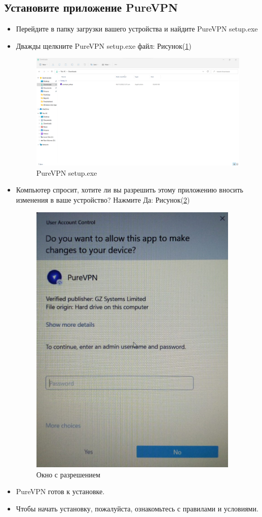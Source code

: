 \subsection{Установите приложение PureVPN} 
\begin{itemize}
\item Перейдите в папку загрузки вашего устройства и найдите PureVPN setup.exe
\item Дважды щелкните PureVPN setup.exe файл:  Рисунок(\ref{fig:2})
\begin{figure}[H]
\includegraphics[width=14cm]{2.png}
\centering
\caption{PureVPN setup.exe}
\label{fig:2}
\end{figure}
\item Компьютер спросит, хотите ли вы разрешить этому приложению вносить изменения в ваше устройство? Нажмите Да:  Рисунок(\ref{fig:3})
\begin{figure}[H]
\includegraphics[width=10cm]{3.png}
\centering
\caption{Окно с разрешением}
\label{fig:3}
\end{figure}
\item PureVPN готов к установке.
\item Чтобы начать установку, пожалуйста, ознакомьтесь с правилами и условиями.


\end{itemize}
